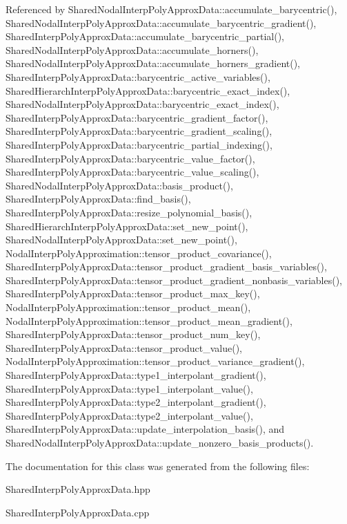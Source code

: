 Referenced by Shared\+Nodal\+Interp\+Poly\+Approx\+Data\+::accumulate\+\_\+barycentric(), Shared\+Nodal\+Interp\+Poly\+Approx\+Data\+::accumulate\+\_\+barycentric\+\_\+gradient(), Shared\+Interp\+Poly\+Approx\+Data\+::accumulate\+\_\+barycentric\+\_\+partial(), Shared\+Nodal\+Interp\+Poly\+Approx\+Data\+::accumulate\+\_\+horners(), Shared\+Nodal\+Interp\+Poly\+Approx\+Data\+::accumulate\+\_\+horners\+\_\+gradient(), Shared\+Interp\+Poly\+Approx\+Data\+::barycentric\+\_\+active\+\_\+variables(), Shared\+Hierarch\+Interp\+Poly\+Approx\+Data\+::barycentric\+\_\+exact\+\_\+index(), Shared\+Nodal\+Interp\+Poly\+Approx\+Data\+::barycentric\+\_\+exact\+\_\+index(), Shared\+Interp\+Poly\+Approx\+Data\+::barycentric\+\_\+gradient\+\_\+factor(), Shared\+Interp\+Poly\+Approx\+Data\+::barycentric\+\_\+gradient\+\_\+scaling(), Shared\+Interp\+Poly\+Approx\+Data\+::barycentric\+\_\+partial\+\_\+indexing(), Shared\+Interp\+Poly\+Approx\+Data\+::barycentric\+\_\+value\+\_\+factor(), Shared\+Interp\+Poly\+Approx\+Data\+::barycentric\+\_\+value\+\_\+scaling(), Shared\+Nodal\+Interp\+Poly\+Approx\+Data\+::basis\+\_\+product(), Shared\+Interp\+Poly\+Approx\+Data\+::find\+\_\+basis(), Shared\+Interp\+Poly\+Approx\+Data\+::resize\+\_\+polynomial\+\_\+basis(), Shared\+Hierarch\+Interp\+Poly\+Approx\+Data\+::set\+\_\+new\+\_\+point(), Shared\+Nodal\+Interp\+Poly\+Approx\+Data\+::set\+\_\+new\+\_\+point(), Nodal\+Interp\+Poly\+Approximation\+::tensor\+\_\+product\+\_\+covariance(), Shared\+Interp\+Poly\+Approx\+Data\+::tensor\+\_\+product\+\_\+gradient\+\_\+basis\+\_\+variables(), Shared\+Interp\+Poly\+Approx\+Data\+::tensor\+\_\+product\+\_\+gradient\+\_\+nonbasis\+\_\+variables(), Shared\+Interp\+Poly\+Approx\+Data\+::tensor\+\_\+product\+\_\+max\+\_\+key(), Nodal\+Interp\+Poly\+Approximation\+::tensor\+\_\+product\+\_\+mean(), Nodal\+Interp\+Poly\+Approximation\+::tensor\+\_\+product\+\_\+mean\+\_\+gradient(), Shared\+Interp\+Poly\+Approx\+Data\+::tensor\+\_\+product\+\_\+num\+\_\+key(), Shared\+Interp\+Poly\+Approx\+Data\+::tensor\+\_\+product\+\_\+value(), Nodal\+Interp\+Poly\+Approximation\+::tensor\+\_\+product\+\_\+variance\+\_\+gradient(), Shared\+Interp\+Poly\+Approx\+Data\+::type1\+\_\+interpolant\+\_\+gradient(), Shared\+Interp\+Poly\+Approx\+Data\+::type1\+\_\+interpolant\+\_\+value(), Shared\+Interp\+Poly\+Approx\+Data\+::type2\+\_\+interpolant\+\_\+gradient(), Shared\+Interp\+Poly\+Approx\+Data\+::type2\+\_\+interpolant\+\_\+value(), Shared\+Interp\+Poly\+Approx\+Data\+::update\+\_\+interpolation\+\_\+basis(), and Shared\+Nodal\+Interp\+Poly\+Approx\+Data\+::update\+\_\+nonzero\+\_\+basis\+\_\+products().



The documentation for this class was generated from the following files\+:\begin{DoxyCompactItemize}
\item 
Shared\+Interp\+Poly\+Approx\+Data.\+hpp\item 
Shared\+Interp\+Poly\+Approx\+Data.\+cpp\end{DoxyCompactItemize}
